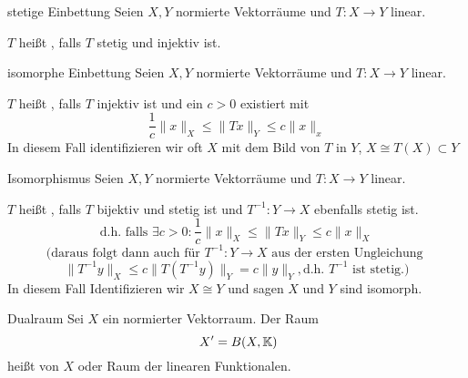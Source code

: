 	\begin{karte}{stetige Einbettung}
		Seien $X, Y$ normierte Vektorräume und $T: X \rightarrow Y$ linear.
	
		$T$ hei{\ss}t , falls $T$ stetig und injektiv ist.
	\end{karte}

	\begin{karte}{isomorphe Einbettung}
		Seien $X, Y$ normierte Vektorräume und $T: X \rightarrow Y$ linear.
		
	$T$ hei{\ss}t , falls $T$ injektiv ist und ein $c > 0$ existiert mit
			\[ \frac{1}{c} \| x \|_{X} \leq \| Tx \|_{Y} \leq c \| x \|_{x} \]
			In diesem Fall identifizieren wir oft $X$ mit dem Bild von $T$ in $Y$, $X \cong T(X) \subset Y$
	\end{karte}
	
	\begin{karte}{Isomorphismus}
		Seien $X, Y$ normierte Vektorräume und $T: X \rightarrow Y$ linear.
		
	$T$ hei{\ss}t , falls $T$ bijektiv und stetig ist und $T^{-1}: Y \rightarrow X$ ebenfalls stetig ist. 
			\[ \text{d.h. falls } \exists c > 0: \frac{1}{c} \| x \|_{X} \leq \| T x \|_{Y} \leq c \| x \|_{X} \]
			\[ \text{(daraus folgt dann auch für }T^{-1}: Y \rightarrow X \text{ aus der ersten Ungleichung } \]
			\[ \| T^{-1}y \|_{X} \leq c \| T (T^{-1}y) \|_{Y} = c \| y \|_{Y}, \text{d.h. } T^{-1} \text{ ist stetig.)}\]
			In diesem Fall Identifizieren wir $X \cong Y$ und sagen $X$ und $Y$ sind isomorph.
	\end{karte}
	
	\begin{karte}{Dualraum}
		Sei $X$ ein normierter Vektorraum. Der Raum
 		\[ X' = B(X, \MdK) \]	
 		hei{\ss}t  von $X$ oder Raum der linearen Funktionalen.
	\end{karte}